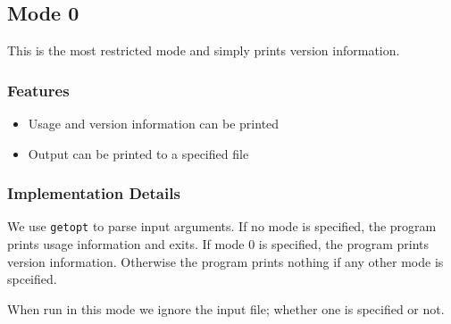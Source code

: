 \subsection{Mode 0}

This is the most restricted mode and simply prints version information.

\subsubsection{Features}

\begin{itemize}
    \item Usage and version information can be printed
    \item Output can be printed to a specified file
\end{itemize}

\subsubsection{Implementation Details}

We use \verb|getopt| to parse input arguments. If no mode is specified, the program prints usage information and exits. If mode 0 is specified, the program prints version information. Otherwise the program prints nothing if any other mode is spceified. 

When run in this mode we ignore the input file; whether one is specified or not.